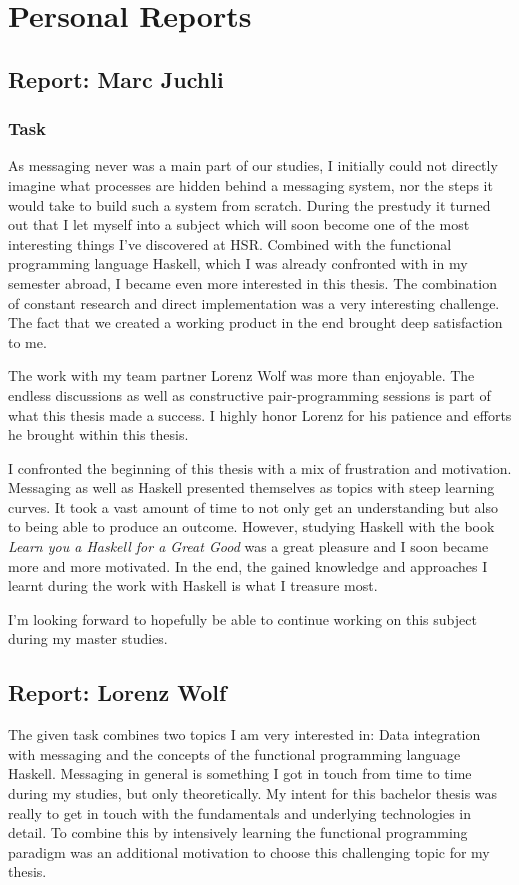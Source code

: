 \chapter{Personal Reports}

\section*{Report: Marc Juchli}

\subsection*{Task}

As messaging never was a main part of our studies, I initially could not
directly imagine what processes are hidden behind a messaging system, nor the
steps it would take to build such a system from scratch.  During the prestudy it
turned out that I let myself into a subject which will soon become one of the
most interesting things I've discovered at HSR. Combined with the functional
programming language Haskell, which I was already confronted with in my semester
abroad, I became even more interested in this thesis. The combination of
constant research and direct implementation was a very interesting challenge.
The fact that we created a working product in the end brought deep satisfaction
to me.

The work with my team partner Lorenz Wolf was more than enjoyable. The endless
discussions as well as constructive pair-programming sessions is part of what
this thesis made a success. I highly honor Lorenz for his patience and efforts
he brought within this thesis.

I confronted the beginning of this thesis with a mix of frustration and
motivation. Messaging as well as Haskell presented themselves as topics with
steep learning curves. It took a vast amount of time to not only get an
understanding but also to being able to produce an outcome.  However, studying
Haskell with the book \textit{Learn you a Haskell for a Great Good} was a great
pleasure and I soon became more and more motivated.  In the end, the gained
knowledge and approaches I learnt during the work with Haskell is what I
treasure most.

I'm looking forward to hopefully be able to continue working on this subject
during my master studies.


\section*{Report: Lorenz Wolf}
The given task combines two topics I am very interested in: Data integration
with messaging and the concepts of the functional programming language Haskell.
Messaging in general is something I got in touch from time to time during my
studies, but only theoretically. My intent for this bachelor thesis was really to
get in touch with the fundamentals and underlying technologies in detail. To
combine this by intensively learning the functional programming paradigm was an
additional motivation to choose this challenging topic for my thesis.

